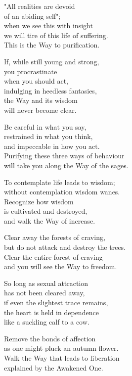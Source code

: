 "All realities are devoid\\
of an abiding self";\\
when we see this with insight\\
we will tire of this life of suffering.\\
This is the Way to purification.


If, while still young and strong,\\
you procrastinate\\
when you should act,\\
indulging in heedless fantasies,\\
the Way and its wisdom\\
will never become clear.


Be careful in what you say,\\
restrained in what you think,\\
and impeccable in how you act.\\
Purifying these three ways of behaviour\\
will take you along the Way of the sages.


To contemplate life leads to wisdom;\\
without contemplation wisdom wanes.\\
Recognize how wisdom\\
is cultivated and destroyed,\\
and walk the Way of increase.


Clear away the forests of craving,\\
but do not attack and destroy the trees.\\
Clear the entire forest of craving\\
and you will see the Way to freedom.


So long as sexual attraction\\
has not been cleared away,\\
if even the slightest trace remains,\\
the heart is held in dependence\\
like a suckling calf to a cow.


Remove the bonds of affection\\
as one might pluck an autumn flower.\\
Walk the Way that leads to liberation\\
explained by the Awakened One.


